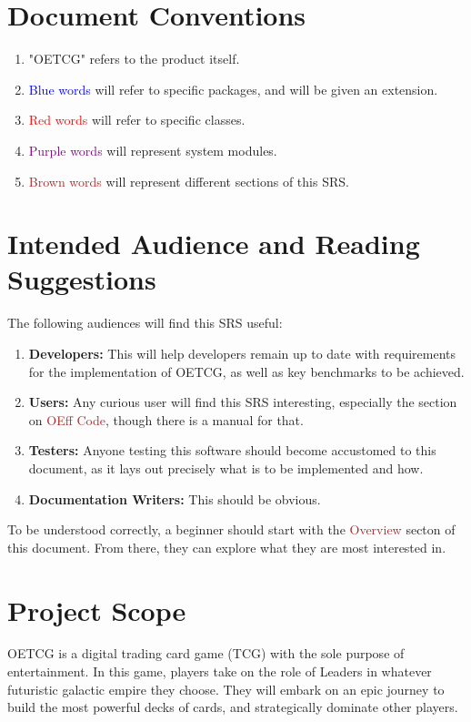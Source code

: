 \documentclass{scrreprt}
\begin{document}
\section{Document Conventions}

\begin{enumerate}
	\item "OETCG" refers to the product itself.
	\item \textcolor{blue}{Blue words} will refer to specific packages, and will be given an extension.
	\item \textcolor{red}{Red words} will refer to specific classes.
	\item \textcolor{purple}{Purple words} will represent system modules.
	\item \textcolor{brown}{Brown words} will represent different sections of this SRS.
\end{enumerate}

\section{Intended Audience and Reading Suggestions}

The following audiences will find this SRS useful:

\begin{enumerate}
	\item \textbf{Developers:} This will help developers remain up to date with requirements for the implementation of OETCG, as well as key benchmarks to be  achieved.
	\item \textbf{Users:} Any curious user will find this SRS interesting, especially the section on \textcolor{brown}{OEff Code}, though there is a manual for that.
	\item \textbf{Testers:} Anyone testing this software should become accustomed to this document, as it lays out precisely what is to be implemented and how.
	\item \textbf{Documentation Writers:} This should be obvious.
\end{enumerate}

To be understood correctly, a beginner should start with the \textcolor{brown}{Overview} secton of this document. From there, they can explore what they are most interested in.

\section{Project Scope}
OETCG is a digital trading card game (TCG) with the sole purpose of entertainment. 
In this game, players take on the role of Leaders in whatever futuristic galactic empire they choose. They will embark on an epic journey to build the most powerful decks of cards, and strategically dominate other players.
\end{document}
